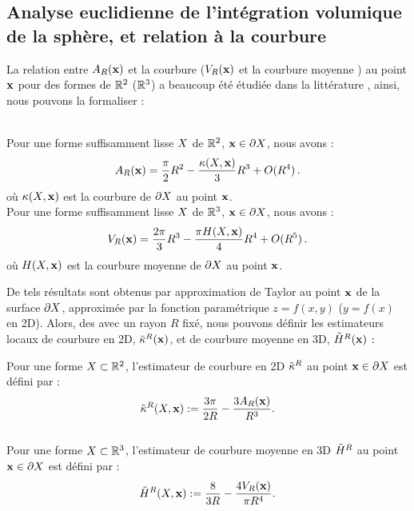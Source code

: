 \subsection{Analyse euclidienne de l'intégration volumique de la sphère, et relation à la courbure}
\label{sec:pottmann-principle}
%
La relation entre $A_R(\mathbf{x})$ et la courbure (\resp $V_R(\mathbf{x})$ et la courbure
moyenne ) au point $\mathbf{x}$ pour des formes de $\mathbb{R}^2$ (\respp $\mathbb{R}^3$) a beaucoup
été étudiée dans la littérature \cite{Bullard1995,Pottmann2007,Pottmann2009},
ainsi, nous pouvons la formaliser :
%
\begin{lemma}{\textbf{\cite{Pottmann2009}}}\\
\label{lem:pottmann-2d}
  Pour une forme suffisamment lisse $X$ de $\mathbb{R}^2$, $\mathbf{x} \in \partial X$, nous
  avons :
  \begin{equation}
    \label{eq:volume2d}
    A_R(\mathbf{x}) = \frac{\pi}{2} R^2 - \frac{\kappa(X,\mathbf{x})}{3}R^3 + O(R^4)\,.
  \end{equation}
  où $\kappa(X,\mathbf{x})$ est la courbure de $\partial X$ au point $\mathbf{x}$.
  \\
  Pour une forme suffisamment lisse $X$ de $\mathbb{R}^3$, $\mathbf{x} \in \partial X$, nous
  avons :
  \begin{equation}
    \label{eq:volume3d}
    V_R(\mathbf{x}) = \frac{2\pi}{3} R^3 - \frac{\pi H(X,\mathbf{x})}{4}R^4 + O(R^5)\,.
  \end{equation}
  où $H(X,\mathbf{x})$ est la courbure moyenne de $\partial X$ au point $\mathbf{x}$.
\end{lemma}
%
De tels résultats sont obtenus par approximation de Taylor au point $\mathbf{x}$ de la
surface $\partial X$, approximée par la fonction paramétrique $z=f(x,y)$ ($y=f(x)$ en
2D). Alors, des  avec un
rayon $R$ fixé, nous pouvons définir les estimateurs locaux de courbure en 2D,
$\tilde{\kappa}^{R}(\mathbf{x})$, et de courbure moyenne en 3D, $\tilde{H}^{R}(\mathbf{x})$ :
%
\begin{definition}{}
  \label{def:pottmann-2d-3d-mean}
  Pour une forme $X \subset \mathbb{R}^2$, l'estimateur de courbure en 2D $\tilde{\kappa}^{R}$
  au point $\mathbf{x} \in \partial X$ est défini par :
  \begin{equation}
    \label{eq:pottmann-2d}
    \tilde{\kappa}^{R}(X,\mathbf{x}) := \frac{3\pi}{2 R} - \frac{3 A_R(\mathbf{x})}{R^3} .
  \end{equation}
  \\
  Pour une forme $X \subset \mathbb{R}^3$, l'estimateur de courbure moyenne en 3D
  $\tilde{H}^{R}$ au point $\mathbf{x} \in \partial X$ est défini par :
  \begin{equation}
    \label{eq:pottmann-3d-mean}
    \tilde{H}^{R}(X,\mathbf{x}) := \frac{8}{3 R} - \frac{4 V_R(\mathbf{x})}{\pi R^4}.
  \end{equation}
\end{definition}
